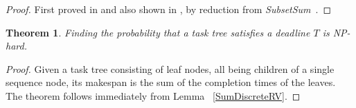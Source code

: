 \documentclass{article}
\newtheorem{theorem}{Theorem}
\begin{document}
\begin{proof} 
First proved in \cite{---} and also shown in \cite{cohen2015estimating}, by reduction from \textit{SubsetSum}~\cite[problem number SP13]{Garey:1990:CIG:574848}.
%
\end{proof}
 
\begin{theorem}
Finding the probability that a task tree satisfies a deadline $T$ is NP-hard.
\end{theorem}

\begin{proof} Given a task tree consisting of  leaf nodes, all being children of a single sequence node, its makespan
is the sum of the completion times of the leaves. The theorem follows immediately from Lemma ~\ref{SumDiscreteRV}. 
\end{proof}
\end{document}
